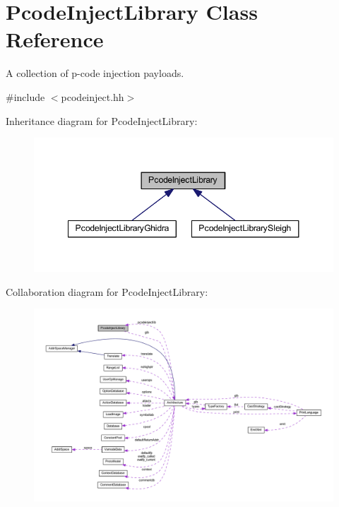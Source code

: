 \hypertarget{class_pcode_inject_library}{}\section{Pcode\+Inject\+Library Class Reference}
\label{class_pcode_inject_library}


A collection of p-\/code injection payloads.  




{\ttfamily \#include $<$pcodeinject.\+hh$>$}



Inheritance diagram for Pcode\+Inject\+Library\+:
\nopagebreak
\begin{figure}[H]
\begin{center}
\leavevmode
\includegraphics[width=348pt]{class_pcode_inject_library__inherit__graph}
\end{center}
\end{figure}


Collaboration diagram for Pcode\+Inject\+Library\+:
\nopagebreak
\begin{figure}[H]
\begin{center}
\leavevmode
\includegraphics[width=350pt]{class_pcode_inject_library__coll__graph}
\end{center}
\end{figure}
